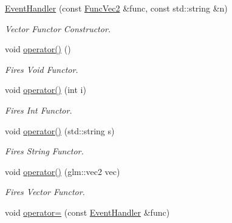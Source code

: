 \begin{DoxyCompactItemize}
\mbox{\hyperlink{class_event_handler_aeb54e46cc16b35a2f3ced7cdc31f3d55}{Event\+Handler}} (const \mbox{\hyperlink{class_event_handler_a814f37c7df5b2bf170d82904b3e525d6}{Func\+Vec2}} \&func, const std\+::string \&n)
\begin{DoxyCompactList}\small\item\em Vector Functor Constructor. \end{DoxyCompactList}\item 
\mbox{\label{class_event_handler_a45684d26fef24278c15a21894e64af18}} 
void \mbox{\hyperlink{class_event_handler_a45684d26fef24278c15a21894e64af18}{operator()}} ()
\begin{DoxyCompactList}\small\item\em Fires Void Functor. \end{DoxyCompactList}\item 
\mbox{\label{class_event_handler_aaf68fb8408f4d2740d0086de802ac69e}} 
void \mbox{\hyperlink{class_event_handler_aaf68fb8408f4d2740d0086de802ac69e}{operator()}} (int i)
\begin{DoxyCompactList}\small\item\em Fires Int Functor. \end{DoxyCompactList}\item 
\mbox{\label{class_event_handler_a4083d0f599c7558894810635e563cd8e}} 
void \mbox{\hyperlink{class_event_handler_a4083d0f599c7558894810635e563cd8e}{operator()}} (std\+::string s)
\begin{DoxyCompactList}\small\item\em Fires String Functor. \end{DoxyCompactList}\item 
\mbox{\label{class_event_handler_a7c704b798b8b57610fbf194899915b28}} 
void \mbox{\hyperlink{class_event_handler_a7c704b798b8b57610fbf194899915b28}{operator()}} (glm\+::vec2 vec)
\begin{DoxyCompactList}\small\item\em Fires Vector Functor. \end{DoxyCompactList}\item 
\mbox{\label{class_event_handler_a5a44f133d79f06b728b83ce005d88644}} 
void \mbox{\hyperlink{class_event_handler_a5a44f133d79f06b728b83ce005d88644}{operator=}} (const \mbox{\hyperlink{class_event_handler}{Event\+Handler}} \&func)

\end{DoxyCompactItemize}
